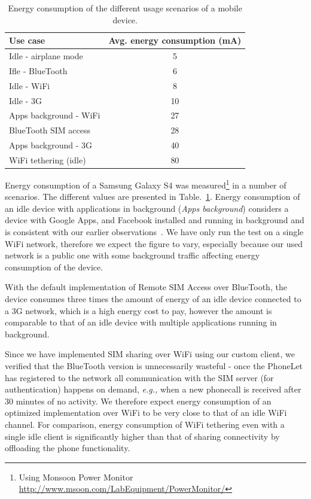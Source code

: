 \documentclass{sig-alternate-10pt}
\providecommand{\eg}{\emph{e.g.,} }
\begin{document}
\begin{table}[t]
{
\small
\begin{tabular}{| l | c |}
\hline
  \textbf{Use case}         & \textbf{Avg. energy consumption (mA)}  \\ \hline
  Idle - airplane mode      & 5     \\ \hline
  Ifle - BlueTooth          & 6     \\ \hline
  Idle - WiFi               & 8     \\ \hline
  Idle - 3G                 & 10    \\ \hline
  Apps background - WiFi    & 27    \\ \hline
  BlueTooth SIM access      & 28    \\ \hline
  Apps background - 3G      & 40    \\ \hline
  WiFi tethering (idle)     & 80    \\ \hline
\end{tabular}
}
\vspace{-3mm}
\caption{Energy consumption of the different usage scenarios of a mobile device.}
\label{tab:energy}
\vspace{-3mm}
\end{table}

Energy consumption of a Samsung Galaxy S4 was measured\footnote{Using Monsoon Power Monitor \url{http://www.msoon.com/LabEquipment/PowerMonitor/}} in a number of scenarios. The different values are presented in Table.~\ref{tab:energy}. Energy consumption of an idle device with applications in background (\emph{Apps background}) considers a device with Google Apps, and Facebook installed and running in background and is consistent with our earlier observations~\cite{Aucinas:2013uk}. We have only run the test on a single WiFi network, therefore we expect the figure to vary, especially because our used network is a public one with some background traffic affecting energy consumption of the device.

With the default implementation of Remote SIM Access over BlueTooth, the device consumes three times the amount of energy of an idle device connected to a 3G network, which is a high energy cost to pay, however the amount is comparable to that of an idle device with multiple applications running in background.

Since we have implemented SIM sharing over WiFi using our custom client, we verified that the BlueTooth version is unnecessarily wasteful - once the PhoneLet has registered to the network all communication with the SIM server (for authentication) happens on demand, \eg when a new phonecall is received after 30 minutes of no activity. We therefore expect energy consumption of an optimized implementation over WiFi to be very close to that of an idle WiFi channel. For comparison, energy consumption of WiFi tethering even with a single idle client is significantly higher than that of sharing connectivity by offloading the phone functionality. 
\end{document}
